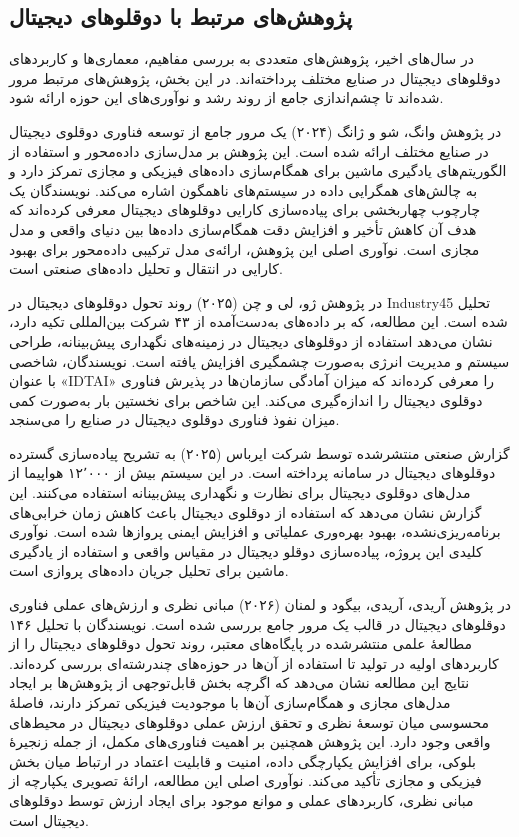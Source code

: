 \subsection{پژوهش‌های مرتبط با دوقلوهای دیجیتال}

در سال‌های اخیر، پژوهش‌های متعددی به بررسی مفاهیم، معماری‌ها و کاربردهای دوقلوهای دیجیتال  در صنایع مختلف پرداخته‌اند. در این بخش، پژوهش‌های مرتبط مرور شده‌اند تا چشم‌اندازی جامع از روند رشد و نوآوری‌های این حوزه ارائه شود.


در پژوهش 
وانگ، شو و ژانگ (۲۰۲۴)
  \cite{wang2024digitaltwin} یک مرور جامع از توسعه فناوری دوقلوی دیجیتال در صنایع مختلف ارائه شده است. این پژوهش بر مدل‌سازی داده‌محور و استفاده از الگوریتم‌های یادگیری ماشین برای همگام‌سازی داده‌های فیزیکی و مجازی تمرکز دارد و به چالش‌های همگرایی داده در سیستم‌های ناهمگون اشاره می‌کند. نویسندگان یک چارچوب چهاربخشی برای پیاده‌سازی کارایی دوقلوهای دیجیتال معرفی کرده‌اند که هدف آن کاهش تأخیر و افزایش دقت همگام‌سازی داده‌ها بین دنیای واقعی و مدل مجازی است. نوآوری اصلی این پژوهش، ارائه‌ی مدل ترکیبی داده‌محور برای بهبود کارایی در انتقال و تحلیل داده‌های صنعتی است.

در پژوهش
ژو، لی و چن (۲۰۲۵)
 \cite{zhou2025newera} روند تحول دوقلوهای دیجیتال در \gls{Industry45} تحلیل شده است. این مطالعه، که بر داده‌های به‌دست‌آمده از ۴۳ شرکت بین‌المللی تکیه دارد، نشان می‌دهد استفاده از دوقلوهای دیجیتال در زمینه‌های نگهداری پیش‌بینانه، طراحی سیستم و مدیریت انرژی به‌صورت چشمگیری افزایش یافته است. نویسندگان، شاخصی با عنوان «\gls{IDTAI}» را معرفی کرده‌اند که میزان آمادگی سازمان‌ها در پذیرش فناوری دوقلوی دیجیتال را اندازه‌گیری می‌کند. این شاخص برای نخستین بار به‌صورت کمی میزان نفوذ فناوری دوقلوی دیجیتال در صنایع را می‌سنجد.

 

گزارش صنعتی منتشرشده توسط شرکت
ایرباس (۲۰۲۵)
\cite{airbus2025digitaltwins} به تشریح پیاده‌سازی گسترده دوقلوهای دیجیتال در سامانه 
 \lr{ } \cite{airbus2024skywisecorex}
  پرداخته است. در این سیستم بیش از ۱۲٬۰۰۰ هواپیما از مدل‌های دوقلوی دیجیتال برای نظارت و نگهداری پیش‌بینانه استفاده می‌کنند. این گزارش نشان می‌دهد که استفاده از دوقلوی دیجیتال باعث کاهش زمان خرابی‌های برنامه‌ریزی‌نشده، بهبود بهره‌وری عملیاتی و افزایش ایمنی پروازها شده است. نوآوری کلیدی این پروژه، پیاده‌سازی دوقلو دیجیتال در مقیاس واقعی و استفاده از یادگیری ماشین برای تحلیل جریان داده‌های پروازی است.


در پژوهش
آریدی، آریدی، بیگود و لمنان (۲۰۲۶)
\cite{aridi2026theoretical}
مبانی نظری و ارزش‌های عملی فناوری دوقلوهای دیجیتال در قالب یک مرور جامع بررسی شده است. نویسندگان با تحلیل ۱۴۶ مطالعهٔ علمی منتشرشده در پایگاه‌های معتبر، روند تحول دوقلوهای دیجیتال را از کاربردهای اولیه در تولید تا استفاده از آن‌ها در حوزه‌های چندرشته‌ای بررسی کرده‌اند. نتایج این مطالعه نشان می‌دهد که اگرچه بخش قابل‌توجهی از پژوهش‌ها بر ایجاد مدل‌های مجازی و همگام‌سازی آن‌ها با موجودیت فیزیکی تمرکز دارند، فاصلهٔ محسوسی میان توسعهٔ نظری و تحقق ارزش عملی دوقلوهای دیجیتال در محیط‌های واقعی وجود دارد. این پژوهش همچنین بر اهمیت فناوری‌های مکمل، از جمله زنجیرهٔ بلوکی، برای افزایش یکپارچگی داده، امنیت و قابلیت اعتماد در ارتباط میان بخش فیزیکی و مجازی تأکید می‌کند. نوآوری اصلی این مطالعه، ارائهٔ تصویری یکپارچه از مبانی نظری، کاربردهای عملی و موانع موجود برای ایجاد ارزش توسط دوقلوهای دیجیتال است.



